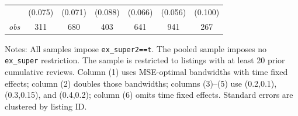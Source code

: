 \begin{table}[!htbp]
\begin{tabular}{lcccccc}
 & (0.075) & (0.071) & (0.088) & (0.066) & (0.056) & (0.100) \\
\textit{obs} & 311 & 680 & 403 & 641 & 941 & 267 \\
\bottomrule
\end{tabular}
\begin{minipage}{0.98\textwidth}\footnotesize
Notes: All samples impose \texttt{ex\_super2==t}. The pooled sample imposes no \texttt{ex\_super} restriction. The sample is restricted to listings with at least 20 prior cumulative reviews. Column (1) uses MSE-optimal bandwidths with time fixed effects; column (2) doubles those bandwidths; columns (3)--(5) use (0.2,0.1), (0.3,0.15), and (0.4,0.2); column (6) omits time fixed effects. Standard errors are clustered by listing ID.
\end{minipage}
\end{table}

